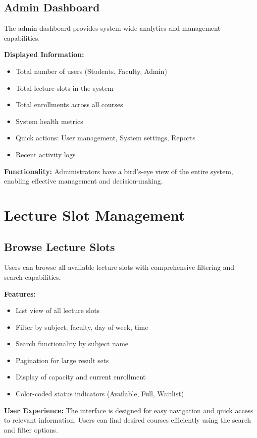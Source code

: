 \subsection{Admin Dashboard}
The admin dashboard provides system-wide analytics and management capabilities.

\textbf{Displayed Information:}
\begin{itemize}
    \item Total number of users (Students, Faculty, Admin)
    \item Total lecture slots in the system
    \item Total enrollments across all courses
    \item System health metrics
    \item Quick actions: User management, System settings, Reports
    \item Recent activity logs
\end{itemize}

\textbf{Functionality:} Administrators have a bird's-eye view of the entire system, enabling effective management and decision-making.

\section{Lecture Slot Management}

\subsection{Browse Lecture Slots}
Users can browse all available lecture slots with comprehensive filtering and search capabilities.

\textbf{Features:}
\begin{itemize}
    \item List view of all lecture slots
    \item Filter by subject, faculty, day of week, time
    \item Search functionality by subject name
    \item Pagination for large result sets
    \item Display of capacity and current enrollment
    \item Color-coded status indicators (Available, Full, Waitlist)
\end{itemize}

\textbf{User Experience:} The interface is designed for easy navigation and quick access to relevant information. Users can find desired courses efficiently using the search and filter options.

